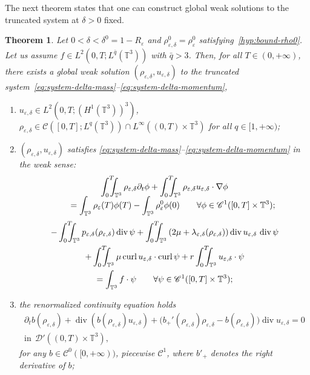 \documentclass[JEP,XML,SOM,Unicode,NoEqCountersInSection]{cedram}
\let\mathcal\mathscr
\let\cal\mathcal
\newcommand{\<}{\bigl\langle}
\renewcommand{\>}{\bigr\rangle}
\newcommand{\intTTT}{\int_0^T\hspace*{-2.5mm}\int_{\TT}}
\newcommand{\labeleq}[1]{}
\newtheorem{thm}{Theorem}[section]
\theoremstyle{definition}
\theoremstyle{remark}
\newcommand{\TT}{\mathbb{T}^3}
\DeclareMathOperator{\curl}{curl}
\DeclareMathOperator{\Div}{div}
\let\ep\varepsilon
\begin{document}
The next theorem states that one can construct global weak solutions to the truncated system at $\delta> 0$ fixed.
\begin{thm}\label{approx}
Let $0 < \delta < \delta^0 = 1-R_\ep$ and $\rho_{\ep,\delta}^0 = \rho_\ep^0$ satisfying~\eqref{hyp:bound-rho0}.
Let us assume $f \in L^2(0,T; L^{\bar{q}}(\TT))$ with $\bar{q}>3$.
Then, for all $T \in (0, +\infty)$, there exists a global weak solution $(\rho_{\ep,\delta},u_{\ep,\delta})$ to the truncated system~\eqref{eq:system-delta-mass}--\eqref{eq:system-delta-momentum}, \ie
\begin{enumerate}
\item $u_{\ep,\delta}\in L^2(0,T;(H^1(\TT))^3)$, $\rho_{\ep,\delta} \in \mathcal{C}([0,T];L^q(\TT)) \cap L^\infty((0,T) \times \TT)$ for all $q \in [1, +\infty)$;
\item $(\rho_{\ep,\delta},u_{\ep,\delta})$ satisfies \eqref{eq:system-delta-mass}--\eqref{eq:system-delta-momentum}
in the weak sense:
\begin{multline*}\labeleq{weak-delta-mass}
\intTTT{\rho_{\ep,\delta} \partial_t \phi}
+ \intTTT{\rho_{\ep,\delta} u_{\ep,\delta} \cdot \nabla \phi} \\[-5pt]
\qquad = \int_{\TT}{\rho_\ep(T) \phi(T)} - \int_{\TT}{\rho_\ep^0 \phi(0)}
\qquad \forall \phi \in \mathcal{C}^1([0,T] \times \TT);
\end{multline*} 
\begin{multline}\label{eq:weak-delta-div-mom}
- \intTTT{p_{\ep,\delta}(\rho_{\ep,\delta})\Div \psi}
+ \intTTT{(2\mu+\lambda_{\ep,\delta}(\rho_{\ep,\delta}))
\Div u_{\ep,\delta} \, \Div \psi} \\
+ \intTTT
\mu\curl u_{\ep,\delta} \cdot \curl \psi
+ r\intTTT{u_{\ep,\delta} \cdot \psi}\\
= \int_{\TT}{f \cdot \psi}
\qquad \forall \psi \in \mathcal{C}^1([0,T] \times \TT);
\end{multline} 
\item the \emph{renormalized continuity equation} holds
\begin{multline}\label{eq:renormalized-delta}
\partial_t b(\rho_{\ep,\delta}) + \Div(b(\rho_{\ep,\delta}) u_{\ep,\delta})
+ \big(b_+'(\rho_{\ep,\delta})\rho_{\ep,\delta}
- b(\rho_{\ep,\delta})\big)\Div u_{\ep,\delta} = 0
\\ \text{in}~~\mathcal{D}'((0,T)\times \TT),
\end{multline}
for any $b \in \mathcal{C}^0([0,+\infty))$, piecewise ${\cal C}^1$, where $b'_+$
denotes the right derivative of $b$;


\end{enumerate}
\end{thm}
\end{document}
